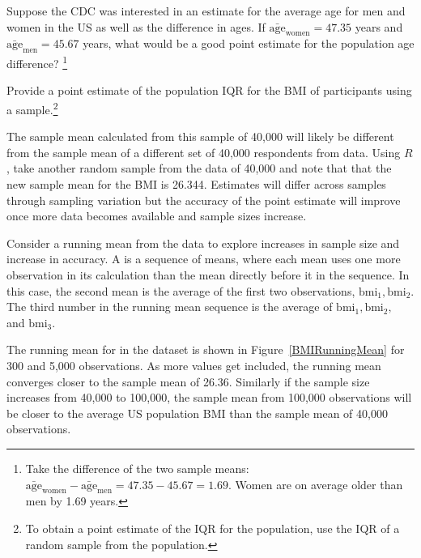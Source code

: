 \begin{exercise} \label{pointEstimateOfDesiredWeights}
Suppose the CDC was interested in an estimate for the average age for men and women in the US as well as the difference in ages. If $\bar{\mathrm{age}}_{\mathrm{women}} = 47.35 $ years and $\bar{\mathrm{age}} _ {\mathrm{men}} = 45.67 $ years, what would be a good point estimate for the population age difference? \footnote{Take the difference of the two sample means: $\bar{\mathrm{age}}_{\mathrm{women}} - \bar{\mathrm{age}} _ {\mathrm{men}} = 47.35 - 45.67 =  1.69$. Women are on average older than men by 1.69 years.}
\end{exercise}

\begin{exercise}
Provide a point estimate of the population IQR for the BMI of participants using a sample.\footnote{To obtain a point estimate of the IQR for the population, use the IQR of a random sample from the population.}


\end{exercise}

The sample mean calculated from this  sample of 40,000 will likely be different from the sample mean of a different set of 40,000 respondents from  data. Using $R$, take another random sample from the  data of 40,000 and note that that the new sample mean for the BMI is 26.344. Estimates will differ across samples through sampling variation but the accuracy of the point estimate will improve once more data becomes available and sample sizes increase.

Consider a running mean from the  data to explore increases in sample size and increase in accuracy. A  is a sequence of means, where each mean uses one more observation in its calculation than the mean directly before it in the sequence. In this case, the second mean is the average of the first two observations, $\mathrm{bmi}_1, \mathrm{bmi}_2$. The third number in the running mean sequence is the average of $\mathrm{bmi}_1, \mathrm{bmi}_2,$ and $\mathrm{bmi}_3$. 

The running mean for  in the  dataset is shown in Figure~\ref{BMIRunningMean} for 300 and 5,000 observations. As more values get included, the running mean converges closer to the sample mean of 26.36. Similarly if the sample size increases from 40,000 to 100,000, the sample mean from 100,000 observations will be closer to the average US population BMI than the sample mean of 40,000 observations. 

